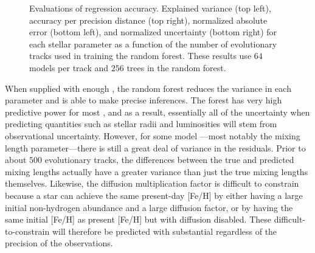 {\begin{landscape}
\begin{figure}
    \caption[Evaluations of regression accuracy]{Evaluations of regression accuracy. Explained variance (top left), accuracy per precision distance (top right), normalized absolute error (bottom left), and normalized uncertainty (bottom right) for each stellar parameter as a function of the number of evolutionary tracks used in training the random forest. These results use $64$ models per track and $256$ trees in the random forest. \label{fig:evaluation-tracks}} 
\end{figure}
\end{landscape}
}

When supplied with enough , the random forest reduces the variance in each parameter and is able to make precise inferences. The forest has very high predictive power for most , and as a result, essentially all of the uncertainty when predicting quantities such as stellar radii and luminosities will stem from observational uncertainty. However, for some model ---most notably the mixing length parameter---there is still a great deal of variance in the residuals. Prior to  about $500$ evolutionary tracks, the differences between the true and predicted mixing lengths actually have a greater variance than just the true mixing lengths themselves. Likewise, the diffusion multiplication factor is difficult to constrain because a star can achieve the same present-day [Fe/H] by either having a large initial non-hydrogen abundance and a large diffusion  factor, or by having the same initial [Fe/H] as present [Fe/H] but with diffusion disabled. These difficult-to-constrain  will therefore be predicted with substantial  regardless of the precision of the observations. 



